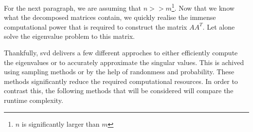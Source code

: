 For the next paragraph, we are assuming that $n>>m$\footnote{$n$ is significantly larger than $m$}.
Now that we know what the decomposed matrices contain, we quickly realise the immense computational power that is required to construct the matrix $AA^T$.
Let alone solve the eigenvalue problem to this matrix.

Thankfully, \gls{svd} delivers a few different approches to either efficiently compute the eigenvalues or to accurately approximate the \gls{singular} values.
This is achived using sampling methods or by the help of randonmess and probability.
These methods significantly reduce the required computational resources.
In order to contrast this, the following methods that will be considered will compare the runtime complexity.



\clearpage
